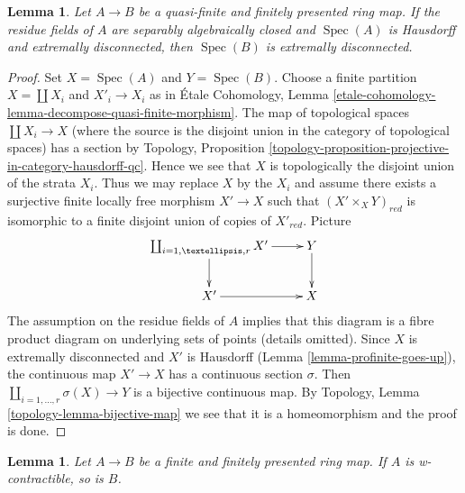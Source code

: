 \documentclass{stacks-project}
\theoremstyle{plain}
\newtheorem{lemma}[subsection]{Lemma}
\theoremstyle{definition}
\theoremstyle{remark}
\numberwithin{equation}{subsection}
\def\Spec{\mathop{\mathrm{Spec}}}
\begin{document}
\begin{lemma}
\label{lemma-finite-finitely-presented-over-extremally-disconnected}
Let $A \to B$ be a quasi-finite and finitely presented ring map.
If the residue fields of $A$ are separably algebraically closed
and $\Spec(A)$ is Hausdorff and extremally disconnected, then $\Spec(B)$ is
extremally disconnected.
\end{lemma}

\begin{proof}
Set $X = \Spec(A)$ and $Y = \Spec(B)$. Choose a finite partition
$X = \coprod X_i$ and $X'_i \to X_i$ as in
\'Etale Cohomology, Lemma
\ref{etale-cohomology-lemma-decompose-quasi-finite-morphism}.
The map of topological spaces $\coprod X_i \to X$ (where the source
is the disjoint union in the category of topological spaces)
has a section by Topology, Proposition
\ref{topology-proposition-projective-in-category-hausdorff-qc}.
Hence we see that $X$ is topologically the disjoint union of the
strata $X_i$. Thus we may replace $X$ by the $X_i$ and assume there
exists a surjective finite locally free morphism $X' \to X$ such that
$(X' \times_X Y)_{red}$ is isomorphic to a finite disjoint union of
copies of $X'_{red}$. Picture
$$
\xymatrix{
\coprod_{i = 1, \ldots, r} X' \ar[r] \ar[d] & Y \ar[d] \\
X' \ar[r] & X
}
$$
The assumption on the residue fields of $A$ implies that
this diagram is a fibre product diagram on underlying sets
of points (details omitted).
Since $X$ is extremally disconnected and $X'$ is Hausdorff
(Lemma \ref{lemma-profinite-goes-up}), the continuous map
$X' \to X$ has a continuous section $\sigma$. Then
$\coprod_{i = 1, \ldots, r} \sigma(X) \to Y$ is a bijective
continuous map. By
Topology, Lemma \ref{topology-lemma-bijective-map}
we see that it is a homeomorphism and the proof is done.
\end{proof}

\begin{lemma}
\label{lemma-finite-finitely-presented-over-w-contractible}
Let $A \to B$ be a finite and finitely presented ring map.
If $A$ is w-contractible, so is $B$.
\end{lemma}
\end{document}
